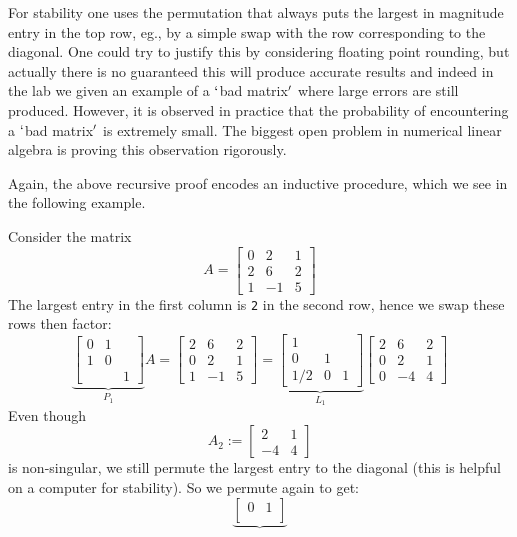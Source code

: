 For stability one uses the permutation that always puts the largest in magnitude entry in the top row, eg., by a simple swap with the row corresponding to the diagonal.  One could try to justify this by considering floating point rounding, but actually there is no guaranteed this will produce accurate results and indeed in the lab we given an example of a \ensuremath{\lq}bad matrix\ensuremath{\rq} where large errors are still produced. However, it is observed in practice that the probability of encountering a \ensuremath{\lq}bad matrix\ensuremath{\rq} is extremely small. The biggest open problem in numerical linear algebra is proving this observation rigorously.

Again, the above recursive proof encodes an inductive procedure, which we see in the following example.

\begin{example} Consider the matrix
\[
A = \begin{bmatrix}
0 & 2 & 1 \\
2 & 6 & 2 \\
1 & -1 & 5
\end{bmatrix}
\]
The largest entry in the first column is \texttt{2} in the second row, hence we swap these rows then factor:
\[
\underbrace{\begin{bmatrix} 0 & 1 \\ 
1 & 0 \\
&& 1 \end{bmatrix}}_{P_1} A =  \begin{bmatrix}
2 & 6 & 2 \\
0 & 2 & 1 \\
1 & -1 & 5
\end{bmatrix} =  \underbrace{\begin{bmatrix}
1 &  &  \\
0 & 1 &  \\
1/2 & 0 & 1
\end{bmatrix}}_{L_1} \begin{bmatrix}
2 & 6 & 2 \\
0 & 2 & 1 \\
0 & -4 & 4
\end{bmatrix}
\]
Even though
\[
A_2 := \begin{bmatrix}
 2 & 1 \\
 -4 & 4
\end{bmatrix}
\]
is non-singular, we still permute the largest entry to the diagonal (this is helpful on a computer for stability). So we permute again to get:
\[
\underbrace{\begin{bmatrix} 0 & 1 \\ 

\end{bmatrix}}\]
\end{example}
